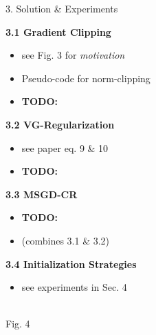 \documentclass[final]{beamer}
\newcommand{\todo}[1]{\textcolor{myred}{\textbf{TODO:} #1}}
\begin{document}
\begin{frame}[t]
\begin{columns}[t,totalwidth=\textwidth]

\begin{column}{0.33\textwidth}
    \begin{block}{3. Solution \& Experiments}
  
      \textbf{3.1 Gradient Clipping}
      \begin{itemize}
        \item see Fig. 3 for \textit{motivation}
        \item Pseudo-code for norm-clipping
        \item \todo{}
      \end{itemize}
  
      \vspace{0.5em}
      \textbf{3.2 VG-Regularization}
      \begin{itemize}
        \item see paper eq. 9 \& 10
        \item  \todo{}
      \end{itemize}
  
      \vspace{0.5em}
      \textbf{3.3 MSGD-CR}
        \begin{itemize}
            \item \todo{}
            \item  (combines 3.1 \& 3.2)
            
    \end{itemize}
  
      \vspace{0.5em}
      \textbf{3.4 Initialization Strategies}
      \begin{itemize}
        \item see experiments in Sec. 4
      \end{itemize}
  
      \vspace{1em}
      \begin{center}
        \\[0.3em]
        Fig. 4
      \end{center}


\end{block}
\end{column}
\end{columns}
\end{frame}
\end{document}
